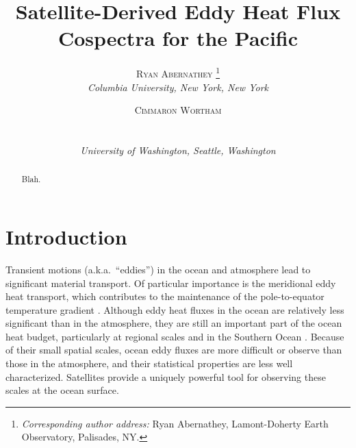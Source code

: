 \documentclass[10pt]{article}
\newcommand{\myabstract}{Blah.}
\begin{document}
%
%
\title{\textbf{\large{Satellite-Derived Eddy Heat Flux Cospectra for the Pacific}}}
%
%
\author{\textsc{Ryan Abernathey}
				\thanks{\textit{Corresponding author address:} 
				Ryan Abernathey, Lamont-Doherty Earth Observatory, 
				Palisades, NY. 
				}\\
\textit{\footnotesize{Columbia University, New York, New York}}
\and 
\centerline{\textsc{Cimmaron Wortham}}\\%
\centerline{\textit{\footnotesize{University of Washington, Seattle, Washington}}}
}
%
{
\twocolumn[
\begin{@twocolumnfalse}
\amstitle

\begin{center}
\begin{minipage}{13.0cm}
\begin{abstract}
	\myabstract
	\newline
	\begin{center}
		\rule{38mm}{0.2mm}
	\end{center}
\end{abstract}
\end{minipage}
\end{center}
\end{@twocolumnfalse}
]
}
{
\amstitle

\begin{abstract}
\myabstract
\end{abstract}

\newpage
}

\section{Introduction}

Transient motions (a.k.a.~``eddies'') in the ocean and atmosphere lead to significant material transport. Of particular importance is the meridional eddy heat transport, which contributes to the maintenance of the pole-to-equator temperature gradient \citep{TrenberthCaron2001,Wunsch2005}. Although eddy heat fluxes in the ocean are relatively less significant than in the atmosphere, they are still an important part of the ocean heat budget, particularly at regional scales and in the Southern Ocean \citep{JayneMarotzke2002,WhatElse?}. Because of their small spatial scales, ocean eddy fluxes are more difficult or observe than those in the atmosphere, and their statistical properties are less well characterized. Satellites provide a uniquely powerful tool for observing these scales at the ocean surface.
\end{document}
